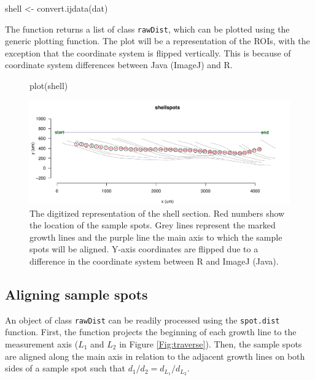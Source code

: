 \documentclass[11pt, a4paper]{article}
\newcommand{\mnote}[1]
{\marginnote{\footnotesize \raggedright \texttt{#1}}}
\begin{document}
\begin{Schunk}
\begin{Sinput}
 shell <- convert.ijdata(dat)
\end{Sinput}
\end{Schunk}

\mnote{plot.
rawDist} The function returns a list of class \texttt{rawDist}, which can be plotted using the generic plotting function. The plot will be a representation of the ROIs, with the exception that the coordinate system is flipped vertically. This is because of coordinate system differences between Java (ImageJ) and R.

\begin{figure}[H]
\begin{center}
\begin{Schunk}
\begin{Sinput}
 plot(shell)
\end{Sinput}
\end{Schunk}
\includegraphics{sclero_tutorial-plot1}
\end{center}
\caption{The digitized representation of the shell section. Red numbers show the location of the sample spots. Grey lines represent the marked growth lines and the purple line the main axis to which the sample spots will be aligned. Y-axis coordinates are flipped due to a difference in the coordinate system between R and ImageJ (Java).}
\label{Fig:rawDist}
\end{figure}

\subsection{Aligning sample spots} \label{sec:spot.dist}

\mnote{spot.dist} An object of class \texttt{rawDist} can be readily processed using the \texttt{spot.dist} function. First, the function projects the beginning of each growth line to the measurement axis ($L_1$ and $L_2$ in Figure \ref{Fig:traverse}). Then, the sample spots are aligned along the main axis in relation to the adjacent growth lines on both sides of a sample spot such that $d_1/d_2 = d_{L_1}/d_{L_2}$.
\end{document}
